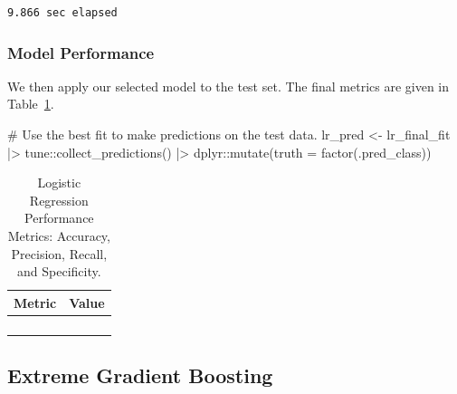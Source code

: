\documentclass[
  letterpaper,
  DIV=11,
  numbers=noendperiod]{scrartcl}
\newenvironment{Shaded}{\begin{snugshade}}{\end{snugshade}}
\newcommand{\AttributeTok}[1]{\textcolor[rgb]{0.40,0.45,0.13}{#1}}
\newcommand{\CommentTok}[1]{\textcolor[rgb]{0.37,0.37,0.37}{#1}}
\newcommand{\FunctionTok}[1]{\textcolor[rgb]{0.28,0.35,0.67}{#1}}
\newcommand{\NormalTok}[1]{\textcolor[rgb]{0.00,0.23,0.31}{#1}}
\newcommand{\OtherTok}[1]{\textcolor[rgb]{0.00,0.23,0.31}{#1}}
\newcommand{\SpecialCharTok}[1]{\textcolor[rgb]{0.37,0.37,0.37}{#1}}
\begin{document}
\begin{verbatim}
9.866 sec elapsed
\end{verbatim}

\subsubsection{Model Performance}\label{model-performance-3}

We then apply our selected model to the test set. The final metrics are
given in Table~\ref{tbl-lr-performance}.

\begin{Shaded}
\begin{Highlighting}[]
\CommentTok{\# Use the best fit to make predictions on the test data.}
\NormalTok{lr\_pred }\OtherTok{\textless{}{-}} 
\NormalTok{  lr\_final\_fit }\SpecialCharTok{|\textgreater{}} 
\NormalTok{  tune}\SpecialCharTok{::}\FunctionTok{collect\_predictions}\NormalTok{() }\SpecialCharTok{|\textgreater{}}
\NormalTok{  dplyr}\SpecialCharTok{::}\FunctionTok{mutate}\NormalTok{(}\AttributeTok{truth =} \FunctionTok{factor}\NormalTok{(.pred\_class))}
\end{Highlighting}
\end{Shaded}

\begin{longtable}{>{\raggedright\arraybackslash}p{}>{\raggedleft\arraybackslash}p{}}

\caption{\label{tbl-lr-performance}Logistic Regression Performance
Metrics: Accuracy, Precision, Recall, and Specificity.}

\tabularnewline

\toprule
Metric & Value \\ 
\midrule\addlinespace[2.5pt]
\cellcolor[HTML]{FFFFFF}{Accuracy} & \cellcolor[HTML]{FFFFFF}{93.4} \\ 
\cellcolor[HTML]{FFFFFF}{Precision} & \cellcolor[HTML]{FFFFFF}{84.6} \\ 
\cellcolor[HTML]{FFFFFF}{Recall} & \cellcolor[HTML]{FFFFFF}{91.7} \\ 
\cellcolor[HTML]{FFFFFF}{Specificity} & \cellcolor[HTML]{FFFFFF}{94.0} \\ 
\bottomrule

\end{longtable}

\subsection{Extreme Gradient Boosting}\label{extreme-gradient-boosting}
\end{document}

